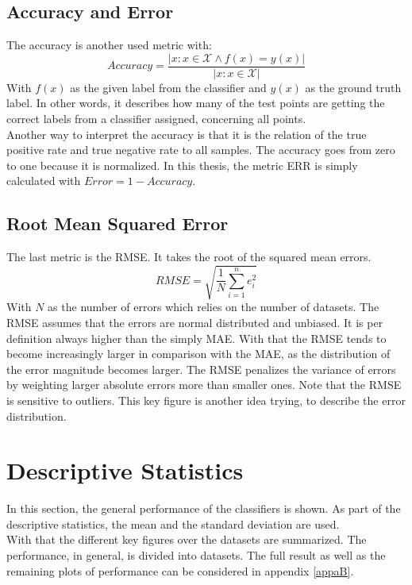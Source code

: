 \subsection{Accuracy and Error}
The accuracy is another used metric with:\cite{Long.2015}
\begin{equation}
	Accuracy = \frac{| x : x \in \mathcal{X} \wedge f(x) = y(x)|}{|x : x \in \mathcal{X}|}
\end{equation}
With $f(x)$ as the given label from the classifier and $y(x)$ as the ground truth label.
In other words, it describes how many of the test points are getting the correct labels from a classifier assigned, concerning all points.\\
Another way to interpret the accuracy is that it is the relation of the true positive rate and true negative rate to all samples.
The accuracy goes from zero to one because it is normalized.\cite[p. 3]{Fawcett.}
In this thesis, the metric \ac{ERR} is simply calculated with  $Error = 1 - Accuracy$.\\
\subsection{Root Mean Squared Error}
The last metric is the \ac{RMSE}. It takes the root of the squared mean errors.
\begin{equation}
	RMSE = \sqrt{\frac{1}{N} \sum_{i=1}^{n}e_i^2}
\end{equation}
With $N$ as the number of errors which relies on the number of datasets. The \ac{RMSE} assumes that the errors are normal distributed and unbiased.
It is per definition always higher than the simply \ac{MAE}.
With that the \acs{RMSE} tends to become increasingly larger in comparison with the \acs{MAE}, as the distribution of the error magnitude becomes larger. 
The \acs{RMSE} penalizes the variance of errors by weighting larger absolute errors more than smaller ones.
Note that the \acs{RMSE} is sensitive to outliers.
This key figure is another idea trying, to describe the error distribution. \cite{Chai.2014}
\FloatBarrier
\section{Descriptive Statistics}\label{EmSecTest}
In this section, the general performance of the classifiers is shown.
As part of the descriptive statistics, the mean and the standard deviation are used.\cite{Igual.2017}\\
With that the different key figures over the datasets are summarized.
The performance, in general, is divided into datasets. The full result as well as the remaining plots of performance can be considered in appendix \ref{appaB}.

